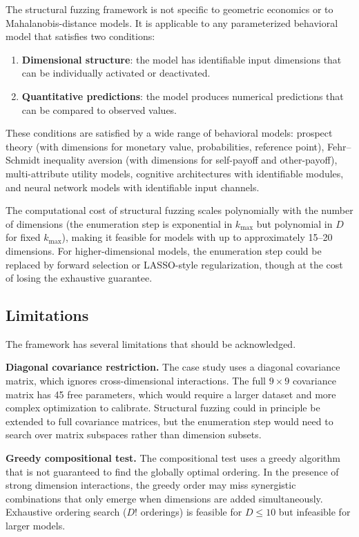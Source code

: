 \documentclass[12pt]{article}
\begin{document}
The structural fuzzing framework is not specific to geometric economics or to Mahalanobis-distance models.  It is applicable to any parameterized behavioral model that satisfies two conditions:

\begin{enumerate}
    \item \textbf{Dimensional structure}: the model has identifiable input dimensions that can be individually activated or deactivated.
    \item \textbf{Quantitative predictions}: the model produces numerical predictions that can be compared to observed values.
\end{enumerate}

These conditions are satisfied by a wide range of behavioral models: prospect theory (with dimensions for monetary value, probabilities, reference point), Fehr--Schmidt inequality aversion (with dimensions for self-payoff and other-payoff), multi-attribute utility models, cognitive architectures with identifiable modules, and neural network models with identifiable input channels.

The computational cost of structural fuzzing scales polynomially with the number of dimensions (the enumeration step is exponential in $k_{\max}$ but polynomial in $D$ for fixed $k_{\max}$), making it feasible for models with up to approximately 15--20 dimensions.  For higher-dimensional models, the enumeration step could be replaced by forward selection or LASSO-style regularization, though at the cost of losing the exhaustive guarantee.

\subsection{Limitations}

The framework has several limitations that should be acknowledged.

\textbf{Diagonal covariance restriction.}  The case study uses a diagonal covariance matrix, which ignores cross-dimensional interactions.  The full $9 \times 9$ covariance matrix has 45 free parameters, which would require a larger dataset and more complex optimization to calibrate.  Structural fuzzing could in principle be extended to full covariance matrices, but the enumeration step would need to search over matrix subspaces rather than dimension subsets.

\textbf{Greedy compositional test.}  The compositional test uses a greedy algorithm that is not guaranteed to find the globally optimal ordering.  In the presence of strong dimension interactions, the greedy order may miss synergistic combinations that only emerge when dimensions are added simultaneously.  Exhaustive ordering search ($D!$ orderings) is feasible for $D \leq 10$ but infeasible for larger models.
\end{document}
